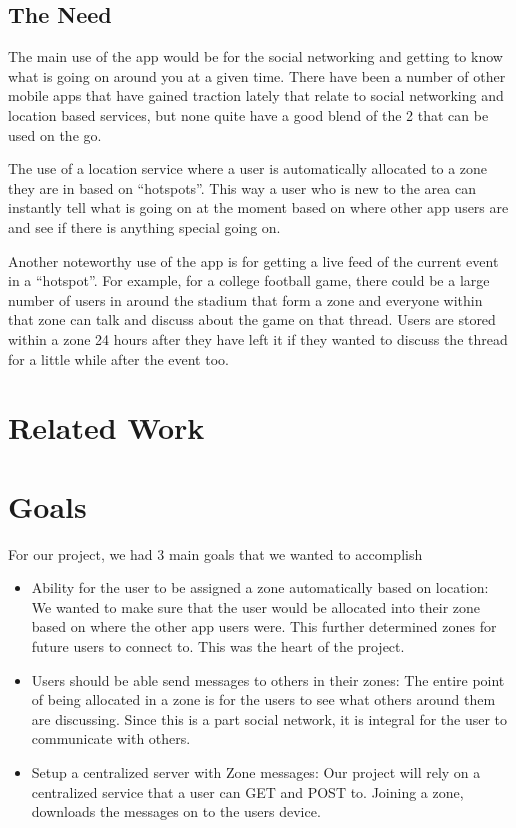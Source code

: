 \documentclass[11pt, journal]{IEEEtran}
\begin{document}
	\subsection{The Need}

		The main use of the app would be for the social networking and getting to know what is going on around you at a given time. There have been a number of other mobile apps that have gained traction lately that relate to social networking and location based services, but none quite have a good blend of the 2 that can be used on the go.

		The use of a location service where a user is automatically allocated to a zone they are in based on ``hotspots''. This way a user who is new to the area can instantly tell what is going on at the moment based on where other app users are and see if there is anything special going on.

		Another noteworthy use of the app is for getting a live feed of the current event in a ``hotspot''. For example, for a college football game, there could be a large number of users in around the stadium that form a zone and everyone within that zone can talk and discuss about the game on that thread. Users are stored within a zone 24 hours after they have left it if they wanted to discuss the thread for a little while after the event too.

\section{Related Work}


\section{Goals}
	For our project, we had 3 main goals that we wanted to accomplish
	\begin{itemize}
		\item Ability for the user to be assigned a zone automatically based on location: We wanted to make sure that the user would be allocated into their zone based on where the other app users were. This further determined zones for future users to connect to. This was the heart of the project.
		\item Users should be able send messages to others in their zones: The entire point of being allocated in a zone is for the users to see what others around them are discussing. Since this is a part social network, it is integral for the user to communicate with others.
		\item Setup a centralized server with Zone messages: Our project will rely on a centralized service that a user can GET and POST to. Joining a zone, downloads the messages on to the users device.
	\end{itemize}
\end{document}
